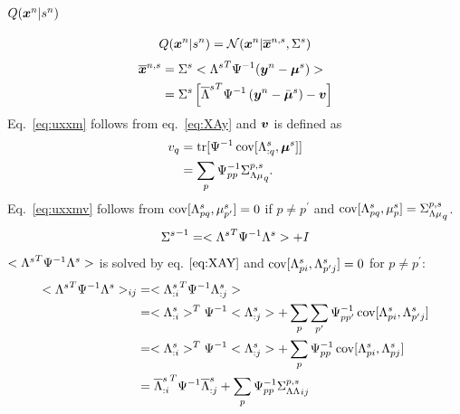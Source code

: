 \documentclass[a4paper]{article}
\begin{document}
\subsection{$Q(\boldsymbol{x}^n|s^n)$}
\begin{align}
  Q(\boldsymbol{x}^n|s^n)=\mathcal{N}(\boldsymbol{x}^n|\overline{\boldsymbol{x}}^{n,s},\Sigma^s)
\end{align}
\begin{align}
  \overline{\boldsymbol{x}}^{n,s}
  &=\Sigma^s<{\Lambda^s}^T\Psi^{-1}(\boldsymbol{y}^n-\boldsymbol{\mu}^s)> \\
  &=\Sigma^s\left[{\overline{\Lambda}^s}^T\Psi^{-1}\left(\boldsymbol{y}^n-\bar{\boldsymbol{\mu}}^s\right)-\boldsymbol{v}\right] \label{eq:uxxm}
\end{align}
Eq.~\ref{eq:uxxm} follows from eq.~\ref{eq:XAy} and $\boldsymbol{v}$ is defined as
\begin{align}
  v_q
  &=\operatorname{tr}[\Psi^{-1}\operatorname{cov}[\Lambda^s_{:q},\boldsymbol{\mu}^s]] \\
  &=\sum_p \Psi^{-1}_{pp} {\Sigma^{p,s}_{\Lambda\mu}}_q. \label{eq:uxxmv}
\end{align}
Eq.~\ref{eq:uxxmv} follows from $\operatorname{cov}[\Lambda^s_{pq},\mu^s_{p^\prime}]=0$ if $p\neq p^\prime$ and $\operatorname{cov}[\Lambda^s_{pq},\mu^s_{p}]={\Sigma^{p,s}_{\Lambda\mu}}_q$.
\begin{align}
  {\Sigma^s}^{-1}=<{\Lambda^s}^T \Psi^{-1} \Lambda^s>+I
\end{align}
$<{\Lambda^s}^T \Psi^{-1} \Lambda^s>$ is solved by eq. $\ref{eq:XAY}$ and $\operatorname{cov}[\Lambda^s_{pi},\Lambda^s_{p^\prime j}]=0$ for $p\ne p^\prime$:
\begin{align}
  <{\Lambda^s}^T \Psi^{-1} \Lambda^s>_{ij}&=<{\Lambda^s_{:i}}^T \Psi^{-1} \Lambda^s_{:j}> \\
  &=<\Lambda^s_{:i}>^T\Psi^{-1} <\Lambda^s_{:j}>+\sum_p\sum_{p^\prime} \Psi^{-1}_{pp^\prime}\operatorname{cov}[\Lambda^s_{pi},\Lambda^s_{p^\prime j}] \\
  &=<\Lambda^s_{:i}>^T\Psi^{-1} <\Lambda^s_{:j}>+\sum_p \Psi^{-1}_{pp}\operatorname{cov}[\Lambda^s_{pi},\Lambda^s_{pj}] \\
  &={\overline{\Lambda}^s_{:i}}^T\Psi^{-1} \overline{\Lambda}^s_{:j}+\sum_p \Psi^{-1}_{pp}{\Sigma^{p,s}_{\Lambda\Lambda}}_{ij}
\end{align}
\end{document}
